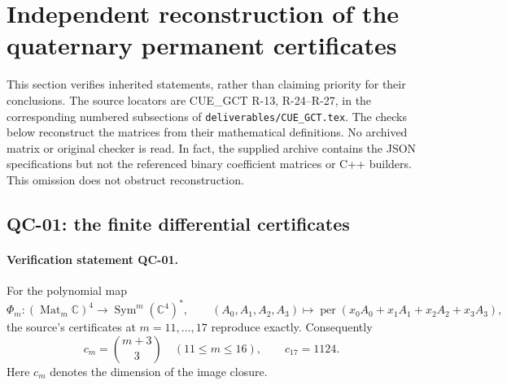 \section{Independent reconstruction of the quaternary permanent certificates}
\label{sec:quaternary-reconstruction}

This section verifies inherited statements, rather than claiming priority
for their conclusions. The source locators are CUE\_GCT R-13,
R-24--R-27, in the corresponding numbered subsections of
\texttt{deliverables/CUE\_GCT.tex}. The checks below reconstruct the
matrices from their mathematical definitions. No archived matrix or
original checker is read. In fact, the supplied archive contains the
JSON specifications but not the referenced binary coefficient matrices
or C++ builders. This omission does not obstruct reconstruction.

\subsection{QC-01: the finite differential certificates}

\paragraph{Verification statement QC-01.}
For the polynomial map
\[
 \Phi_m:(\operatorname{Mat}_m\mathbb C)^4\longrightarrow
       \operatorname{Sym}^m(\mathbb C^4)^*,\qquad
 (A_0,A_1,A_2,A_3)\longmapsto
       \operatorname{per}(x_0A_0+x_1A_1+x_2A_2+x_3A_3),
\]
the source's certificates at $m=11,\ldots,17$ reproduce exactly.
Consequently
\[
 c_m=\binom{m+3}{3}\quad(11\leq m\leq16),\qquad c_{17}=1124.
\]
Here $c_m$ denotes the dimension of the image closure.

